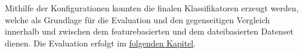 Mithilfe der Konfigurationen konnten die finalen Klassifikatoren erzeugt werden, welche als Grundlage für die Evaluation und den gegenseitigen Vergleich innerhalb und zwischen dem featurebasierten und dem dateibasierten Datenset dienen. Die Evaluation erfolgt im \hyperref[evaluation]{folgenden Kapitel}.

\cleardoublepage